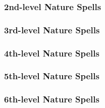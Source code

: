\subsubsection{2nd-level Nature Spells}
\begin{spelllist}
    \SLbarkskin
    \SLconeofcold
    \SLearthspike
    \SLenlarge
    \SLflameblade
    \SLfogcloud
    \SLfreedom
    \SLlongeye
    \SLmarkoftracking
    \SLmeldintostone
    \SLrockblast
    \SLspiderclimb
    \SLswarmofbats
    \SLtotemicmind
    \SLtotemicpower
    \SLtreeshape
    \SLwalloffire
    \SLwallofthorns
    \SLwindstrike
    \SLzephyrblade
\end{spelllist}

\subsubsection{3rd-level Nature Spells}
\begin{spelllist}
    \SLaqueousblade
    \SLcalllightning
    \SLdiscernvulnerability
    \SLdispelmagic
    \SLearthspull
    \SLfungalgrowth
    \SLlightningbolt
    \SLmightythrow
    \SLrotburst
\end{spelllist}

\subsubsection{4th-level Nature Spells}
\begin{spelllist}
    \SLairwalk
    \SLaquaticsphere
    \SLearthglide
    \SLmarkofscrying
    \SLpoison
    \SLsunbeam
\end{spelllist}

\subsubsection{5th-level Nature Spells}
\begin{spelllist}
    \SLavatarofgrowth
    \SLcircleofhealing
    \SLicespike
    \SLstormlord
\end{spelllist}

\subsubsection{6th-level Nature Spells}
\begin{spelllist}
    \SLchainlightning
    \SLfissure
    \SLheal
    \SLinferno
    \SLlifegivingroots
    \SLseismicslam
\end{spelllist}

